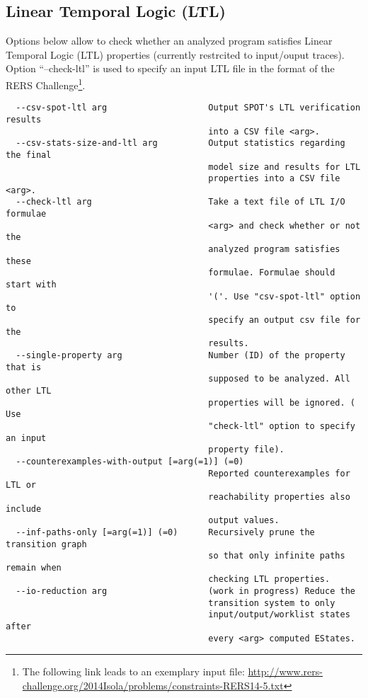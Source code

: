 \documentclass[natbib]{article}
\newcommand{\enquote}[1]{``#1''}
\begin{document}
\subsection{Linear Temporal Logic (LTL)}
Options below allow to check whether an analyzed program satisfies Linear Temporal Logic (LTL) properties 
(currently restrcited to input/ouput traces). Option \enquote{--check-ltl} is used to specify an input LTL file
in the format of the RERS Challenge\footnote{The following link leads to an exemplary input file: 
\url{http://www.rers-challenge.org/2014Isola/problems/constraints-RERS14-5.txt}}.
\begin{verbatim}
  --csv-spot-ltl arg                    Output SPOT's LTL verification results 
                                        into a CSV file <arg>.
  --csv-stats-size-and-ltl arg          Output statistics regarding the final 
                                        model size and results for LTL 
                                        properties into a CSV file <arg>.
  --check-ltl arg                       Take a text file of LTL I/O formulae 
                                        <arg> and check whether or not the 
                                        analyzed program satisfies these 
                                        formulae. Formulae should start with 
                                        '('. Use "csv-spot-ltl" option to 
                                        specify an output csv file for the 
                                        results.
  --single-property arg                 Number (ID) of the property that is 
                                        supposed to be analyzed. All other LTL 
                                        properties will be ignored. ( Use 
                                        "check-ltl" option to specify an input 
                                        property file).
  --counterexamples-with-output [=arg(=1)] (=0)
                                        Reported counterexamples for LTL or 
                                        reachability properties also include 
                                        output values.
  --inf-paths-only [=arg(=1)] (=0)      Recursively prune the transition graph 
                                        so that only infinite paths remain when
                                        checking LTL properties.
  --io-reduction arg                    (work in progress) Reduce the 
                                        transition system to only 
                                        input/output/worklist states after 
                                        every <arg> computed EStates.

\end{verbatim}
\end{document}
